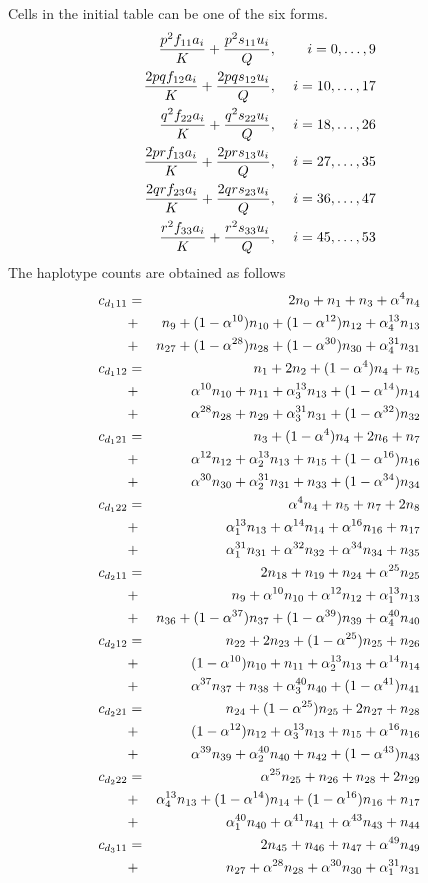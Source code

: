 Cells in the initial table can be one of the six forms.
\begin{eqnarray*}
\frac{p^2f_{11}a_i}{K}+\frac{p^2s_{11}u_i}{Q}, &~& i=0,\ldots,9\cr
\frac{2pqf_{12}a_i}{K}+\frac{2pqs_{12}u_i}{Q}, &~& i=10,\ldots,17\cr
\frac{q^2f_{22}a_i}{K}+\frac{q^2s_{22}u_i}{Q}, &~& i=18,\ldots,26\cr
\frac{2prf_{13}a_i}{K}+\frac{2prs_{13}u_i}{Q}, &~& i=27,\ldots,35\cr
\frac{2qrf_{23}a_i}{K}+\frac{2qrs_{23}u_i}{Q}, &~& i=36,\ldots,47\cr
\frac{r^2f_{33}a_i}{K}+\frac{r^2s_{33}u_i}{Q}, &~& i=45,\ldots,53\cr
\end{eqnarray*}
The haplotype counts are obtained as follows
\begin{eqnarray*}
c_{d_111}&=&2 n_0+n_1+n_3+\alpha^4 n_4\cr
         &+&n_{9}+(1-\alpha^{10}) n_{10}+(1-\alpha^{12}) n_{12}+\alpha^{13}_4 n_{13}\cr
         &+&n_{27}+(1-\alpha^{28}) n_{28}+(1-\alpha^{30}) n_{30}+\alpha^{31}_4 n_{31}\cr
c_{d_112}&=&n_1+2 n_2+(1-\alpha^4 )n_4+n_5\cr
         &+&    \alpha^{10} n_{10}+n_{11}+\alpha^{13}_3 n_{13}+(1-\alpha^{14}) n_{14}\cr
         &+&    \alpha^{28} n_{28}+n_{29}+\alpha^{31}_3 n_{31}+(1-\alpha^{32}) n_{32}\cr
c_{d_121}&=&n_3+(1-\alpha^4 )n_4+2n_6+n_7\cr
         &+&    \alpha^{12} n_{12}+\alpha^{13}_2 n_{13}+n_{15}+(1-\alpha^{16}) n_{16}\cr
         &+&    \alpha^{30} n_{30}+\alpha^{31}_2 n_{31}+n_{33}+(1-\alpha^{34}) n_{34}\cr
c_{d_122}&=&\alpha^4 n_4+n_5+n_7+2n_8\cr
         &+&\alpha^{13}_1 n_{13}+\alpha^{14} n_{14}+\alpha^{16} n_{16}+n_{17}\cr
         &+&\alpha^{31}_1 n_{31}+\alpha^{32} n_{32}+\alpha^{34} n_{34}+n_{35}\cr
c_{d_211}&=&2 n_{18}+n_{19}+n_{24}+\alpha^{25} n_{25}\cr
         &+&n_{9}+\alpha^{10} n_{10}+\alpha^{12} n_{12}+\alpha^{13}_1 n_{13}\cr
         &+&n_{36}+(1-\alpha^{37}) n_{37}+(1-\alpha^{39}) n_{39}+\alpha^{40}_4 n_{40}\cr
c_{d_212}&=&n_{22}+2 n_{23}+(1-\alpha^{25} )n_{25}+n_{26}\cr
         &+&(1-\alpha^{10}) n_{10}+n_{11}+\alpha^{13}_2 n_{13}+\alpha^{14} n_{14}\cr
         &+&    \alpha^{37} n_{37}+n_{38}+\alpha^{40}_3 n_{40}+(1-\alpha^{41}) n_{41}\cr
c_{d_221}&=&n_{24}+(1-\alpha^{25} )n_{25}+2n_{27}+n_{28}\cr
         &+&(1-\alpha^{12}) n_{12}+\alpha^{13}_3 n_{13}+n_{15}+\alpha^{16} n_{16}\cr
         &+&    \alpha^{39} n_{39}+\alpha^{40}_2 n_{40}+n_{42}+(1-\alpha^{43}) n_{43}\cr
c_{d_222}&=&\alpha^{25} n_{25}+n_{26}+n_{28}+2n_{29}\cr
         &+&\alpha^{13}_4 n_{13}+(1-\alpha^{14}) n_{14}+(1-\alpha^{16}) n_{16}+n_{17}\cr
         &+&\alpha^{40}_1 n_{40}+\alpha^{41} n_{41}+\alpha^{43} n_{43}+n_{44}\cr
c_{d_311}&=&2 n_{45}+n_{46}+n_{47}+\alpha^{49} n_{49}\cr
         &+&n_{27}+\alpha^{28} n_{28}+\alpha^{30} n_{30}+\alpha^{31}_1 n_{31}\cr

\end{eqnarray*}
